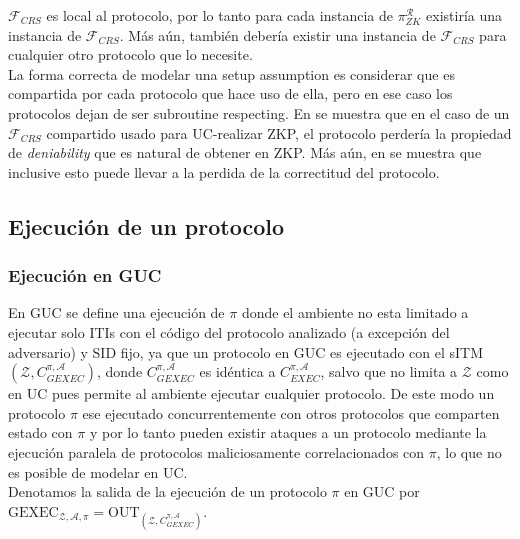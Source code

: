 $\mathcal{F}_{CRS}$ es local al protocolo, por lo tanto para cada instancia de $\pi_{ZK}^\mathcal{R}$
existiría una instancia de $\mathcal{F}_{CRS}$. Más aún, también debería existir una instancia de
$\mathcal{F}_{CRS}$ para cualquier otro protocolo que lo necesite.\\
La forma correcta de modelar una setup assumption es considerar que es compartida por cada protocolo
que hace uso de ella, pero en ese caso los protocolos dejan de ser subroutine respecting.
En \cite{Pass03} se muestra que en el caso de un $\mathcal{F}_{CRS}$ compartido
usado para UC-realizar ZKP, el protocolo perdería la propiedad de \textit{deniability} que es natural
de obtener en ZKP. Más aún, en \cite{journals/tcs/YaoYZ09} se muestra que inclusive esto puede llevar
a la perdida de la correctitud del protocolo.\\

\subsection{Ejecución de un protocolo}

\subsubsection{Ejecución en GUC}

En GUC se define una ejecución de $\pi$ donde el ambiente no esta limitado a ejecutar solo ITIs con el código del
protocolo analizado (a excepción del adversario) y SID fijo, ya que un protocolo en GUC es ejecutado con el
sITM $(\mathcal{Z}, C_{GEXEC}^{\pi, \mathcal{A}})$, donde $C_{GEXEC}^{\pi, \mathcal{A}}$ es idéntica a
$C_{EXEC}^{\pi, \mathcal{A}}$, salvo que no limita a $\mathcal{Z}$ como en UC pues permite al ambiente ejecutar
cualquier protocolo. De este modo un protocolo $\pi$
ese ejecutado concurrentemente con otros protocolos que comparten estado con $\pi$ y por lo tanto pueden existir
ataques a un protocolo mediante la ejecución paralela de protocolos
maliciosamente correlacionados con $\pi$, lo que no es posible de modelar en UC.\\ 
Denotamos la salida de la ejecución de un protocolo $\pi$ en GUC por
$\mathrm{GEXEC}_{
    \mathcal{Z},
    \mathcal{A},
    \pi}
=
\mathrm{OUT}_{(\mathcal{Z},
              C_{GEXEC}^{\pi, \mathcal{A}})}$.\\

